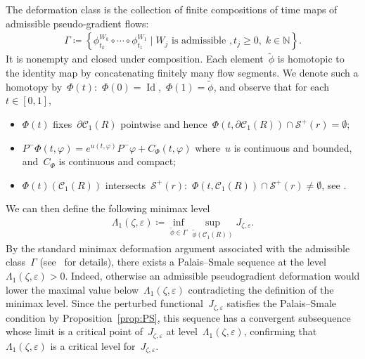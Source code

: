 \documentclass[11pt,final]{amsart}
\newcommand{\p}{\partial}
\newcommand{\eps}{\varepsilon}
\newcommand{\braces}[1]{\left\{#1\right\}} %
\DeclareMathOperator{\id}{Id}
\begin{document}
The deformation class is the collection of finite compositions of time maps of admissible pseudo-gradient flows:
\begin{align}
    \Gamma\coloneqq \braces{ \phi^{W_k}_{t_k}\circ \cdots\circ \phi^{W_1}_{t_1} \mid W_j \mbox{ is admissible }, t_j\geq 0, \; k\in\mathbb{N} }. 
\end{align}
It is nonempty and closed under composition. 
Each element~$\tilde{\phi}$ is homotopic to the identity map by concatenating finitely many flow segments. 
We denote such a homotopy by~$\Phi(t)$:~$\Phi(0)=\id$,~$\Phi(1)=\tilde{\phi}$, and observe that for each~$t\in [0,1]$,
\begin{itemize}
    \item[(1)] $\Phi(t)$ fixes~$\p\mathscr{C}_1(R)$ pointwise and hence~$\Phi(t,\p\mathscr{C}_1(R))\cap \mathscr{S}^+(r) =\emptyset$;
    \item[(2)] $P^-\Phi(t,\varphi)=e^{u(t,\varphi)}P^-\varphi+ C_\Phi(t,\varphi)$ where~$u$ is continuous and bounded, and~$C_\Phi$ is continuous and compact;
    \item[(3)] $\Phi(t)(\mathscr{C}_1(R))$ intersects~$\mathscr{S}^+(r)$:~$\Phi(t,\mathscr{C}_1(R))\cap \mathscr{S}^+(r)\neq \emptyset$, see \cite[Lemma 4.6]{WZ2026Stationary}.
\end{itemize}


We can then define the following minimax level 
\begin{align}
    \Lambda_1(\zeta,\eps) \coloneqq \inf_{\tilde{\phi}\in \Gamma} \sup_{\tilde{\phi}(\mathscr{C}_1(R))} J_{\zeta,\eps}. 
\end{align}
By the standard minimax deformation argument associated with the admissible class~$\Gamma$ (see~\cite{WZ2026Stationary} for details), there exists a Palais--Smale sequence at the level~$\Lambda_1(\zeta,\eps)>0$. 
Indeed, otherwise an admissible pseudogradient deformation would lower the maximal value below~$\Lambda_1(\zeta,\eps)$ contradicting the definition of the minimax level. 
Since the perturbed functional~$J_{\zeta,\eps}$ satisfies the Palais--Smale condition by Proposition~\ref{prop:PS}, this sequence has a convergent subsequence whose limit is a critical point of~$J_{\zeta,\eps}$ at level~$\Lambda_1(\zeta,\eps)$, confirming that~$\Lambda_1(\zeta,\eps)$ is a critical level for~$J_{\zeta,\eps}$. 
\end{document}
